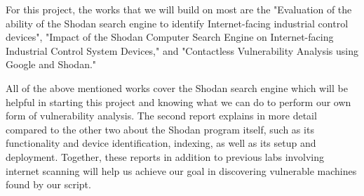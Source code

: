 
For this project, the works that we will build on most are the "Evaluation of
the ability of the Shodan search engine to identify Internet-facing industrial
control devices", "Impact of the Shodan Computer Search Engine on Internet-facing
Industrial Control System Devices," and "Contactless Vulnerability Analysis using
Google and Shodan."

All of the above mentioned works cover the Shodan search engine which will be
helpful in starting this project and knowing what we can do to perform our own
form of vulnerability analysis. The second report explains in more detail
compared to the other two about the Shodan program itself, such as its
functionality and device identification, indexing, as well as its setup and
deployment. Together, these reports in addition to previous labs involving
internet scanning will help us achieve our goal in discovering vulnerable
machines found by our script.